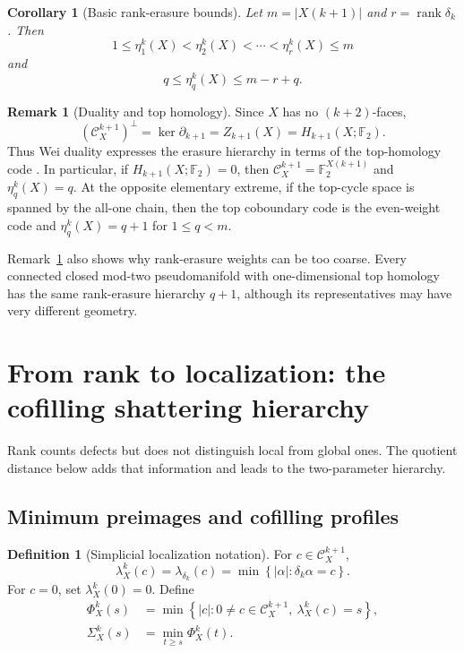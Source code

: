 \documentclass[11pt,letterpaper]{article}
\theoremstyle{plain}
\newtheorem{corollary}[theorem]{Corollary}
\theoremstyle{definition}
\newtheorem{definition}[theorem]{Definition}
\newtheorem{remark}[theorem]{Remark}
\newcommand{\F}{\mathbb{F}_2}
\newcommand{\cC}{\mathcal{C}}
\newcommand{\rank}{\operatorname{rank}}
\newcommand{\1}{\mathbf{1}}
\newcommand{\abs}[1]{\left|#1\right|}
\newcommand{\set}[1]{\left\{#1\right\}}
\begin{document}
\begin{corollary}[Basic rank-erasure bounds]\label{cor:eta-basic}
Let $m=\abs{X(k+1)}$ and $r=\rank\delta_k$.  Then
\[
 1\le \eta_1^k(X)<\eta_2^k(X)<\cdots<\eta_r^k(X)\le m
\]
and
\begin{equation}\label{eq:generalized-singleton}
 q\le \eta_q^k(X)\le m-r+q.
\end{equation}
\end{corollary}

\begin{remark}[Duality and top homology]\label{rem:dual}
Since $X$ has no $(k+2)$-faces,
\[
 (\cC_X^{k+1})^\perp=\ker\partial_{k+1}=Z_{k+1}(X)=H_{k+1}(X;\F).
\]
Thus Wei duality expresses the erasure hierarchy in terms of the top-homology code
\cite{wei1991}.  In particular, if $H_{k+1}(X;\F)=0$, then
$\cC_X^{k+1}=\F^{X(k+1)}$ and $\eta_q^k(X)=q$.  At the opposite elementary extreme,
if the top-cycle space is spanned by the all-one chain, then the top coboundary code is
the even-weight code and $\eta_q^k(X)=q+1$ for $1\le q<m$.
\end{remark}

Remark~\ref{rem:dual} also shows why rank-erasure weights can be too coarse.  Every
connected closed mod-two pseudomanifold with one-dimensional top homology has the same
rank-erasure hierarchy $q+1$, although its representatives may have very different
geometry.

\section{From rank to localization: the cofilling shattering hierarchy}
\label{sec:shattering}

Rank counts defects but does not distinguish local from global ones.  The quotient
distance below adds that information and leads to the two-parameter hierarchy.


\subsection{Minimum preimages and cofilling profiles}

\begin{definition}[Simplicial localization notation]\label{def:localization}
For $c\in\cC_X^{k+1}$,
\begin{equation}\label{eq:lambda}
 \lambda_X^k(c)=\lambda_{\delta_k}(c)
 =\min\set{\abs{\alpha}:\delta_k\alpha=c}.
\end{equation}
For $c=0$, set $\lambda_X^k(0)=0$.  Define
\begin{align}
 \Phi_X^k(s)&=\min\set{\abs c:0\ne c\in\cC_X^{k+1},\ \lambda_X^k(c)=s},
 \label{eq:Phi}\\
 \Sigma_X^k(s)&=\min_{t\ge s}\Phi_X^k(t).
 \label{eq:Sigma}
\end{align}
\end{definition}
\end{document}
